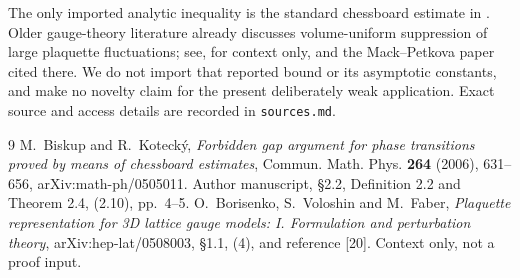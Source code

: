\documentclass[11pt]{article}
\theoremstyle{remark}
\begin{document}
The only imported analytic inequality is the standard chessboard estimate
in \cite{bk}. Older gauge-theory literature already discusses
volume-uniform suppression of large plaquette fluctuations; see, for
context only, \cite[\S1.1, (4)]{bvf} and the Mack--Petkova paper cited
there. We do not import that reported bound or its asymptotic constants,
and make no novelty claim for the present deliberately weak application.
Exact source and access details are recorded in \texttt{sources.md}.

\begin{thebibliography}{9}
M.~Biskup and R.~Koteck\'y,
\emph{Forbidden gap argument for phase transitions proved by means of
chessboard estimates}, Commun. Math. Phys. \textbf{264} (2006), 631--656,
arXiv:math-ph/0505011. Author manuscript, \S2.2, Definition 2.2 and
Theorem 2.4, (2.10), pp.~4--5.
O.~Borisenko, S.~Voloshin and M.~Faber,
\emph{Plaquette representation for 3D lattice gauge models:
I. Formulation and perturbation theory}, arXiv:hep-lat/0508003,
\S1.1, (4), and reference [20]. Context only, not a proof input.
\end{thebibliography}
\end{document}
